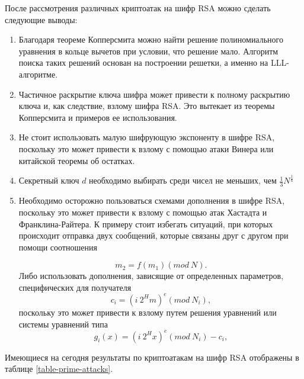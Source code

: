   После рассмотрения различных криптоатак на шифр RSA можно сделать следующие выводы:
    \begin{enumerate}
      \item Благодаря теореме Копперсмита можно найти решение полиномиального уравнения в кольце вычетов при условии, что решение мало. Алгоритм поиска таких решений основан на построении решетки, а именно на LLL-алгоритме.
      \item Частичное раскрытие ключа шифра может привести к полному раскрытию ключа и, как следствие, взлому шифра RSA. Это вытекает из теоремы Копперсмита и примеров ее использования.
      \item Не стоит использовать малую шифрующую экспоненту в шифре RSA, поскольку это может привести к взлому с помощью атаки Винера или китайской теоремы об остатках.
      \item Секретный ключ $d$ необходимо выбирать среди чисел не меньших, чем $\frac{1}{3} N^{\frac{1}{4}}$
      \item Необходимо осторожно пользоваться схемами дополнения в шифре RSA, поскольку это может привести к взлому с помощью атак Хастадта и 
      Франклина-Райтера. К примеру стоит избегать ситуаций, при которых происходит отправка двух сообщений, которые связаны друг с другом при помощи соотношения

        \begin{equation}
          m_2 = f(m_1)(mod \: N).
        \end{equation}
      Либо использовать дополнения, зависящие от определенных параметров, специфических для получателя
        \begin{equation}
          c_i=(i \: 2^H m)^e(mod \: N_i),
        \end{equation}
      поскольку это может привести к взлому путем решения уравнений или системы уравнений типа 
        \begin{equation}
          g_i(x) = (i \: 2^H x)^e(mod \: N_i) - c_i,
        \end{equation}
    \end{enumerate}
  
  Имеющиеся на сегодня результаты по криптоатакам на шифр RSA отображены в таблице \ref{table-prime-attacks}.

